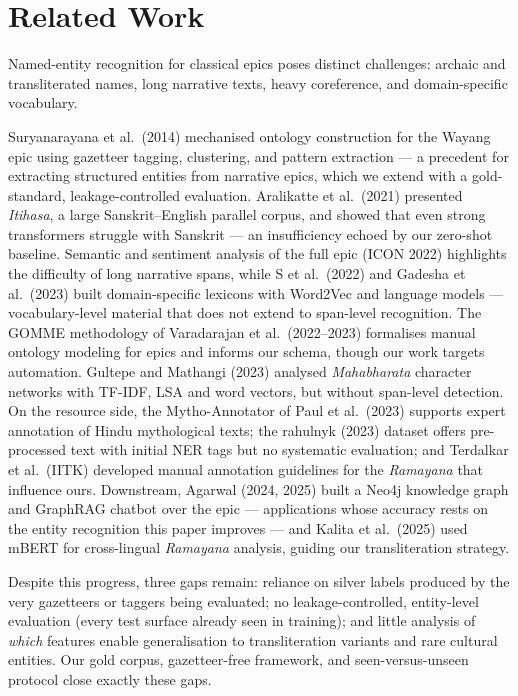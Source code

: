 \documentclass[conference]{IEEEtran}
\begin{document}
\section{Related Work}
\label{sec:related}

Named-entity recognition for classical epics poses distinct challenges: archaic and transliterated names, long narrative texts, heavy coreference, and domain-specific vocabulary.

Suryanarayana et al.\ (2014) mechanised ontology construction for the Wayang epic using gazetteer tagging, clustering, and pattern extraction --- a precedent for extracting structured entities from narrative epics, which we extend with a gold-standard, leakage-controlled evaluation. Aralikatte et al.\ (2021) presented \emph{Itihasa}, a large Sanskrit--English parallel corpus, and showed that even strong transformers struggle with Sanskrit --- an insufficiency echoed by our zero-shot baseline. Semantic and sentiment analysis of the full epic (ICON 2022) highlights the difficulty of long narrative spans, while S et al.\ (2022) and Gadesha et al.\ (2023) built domain-specific lexicons with Word2Vec and language models --- vocabulary-level material that does not extend to span-level recognition. The GOMME methodology of Varadarajan et al.\ (2022--2023) formalises manual ontology modeling for epics and informs our schema, though our work targets automation. Gultepe and Mathangi (2023) analysed \emph{Mahabharata} character networks with TF-IDF, LSA and word vectors, but without span-level detection. On the resource side, the Mytho-Annotator of Paul et al.\ (2023) supports expert annotation of Hindu mythological texts; the rahulnyk (2023) dataset offers pre-processed text with initial NER tags but no systematic evaluation; and Terdalkar et al.\ (IITK) developed manual annotation guidelines for the \emph{Ramayana} that influence ours. Downstream, Agarwal (2024, 2025) built a Neo4j knowledge graph and GraphRAG chatbot over the epic --- applications whose accuracy rests on the entity recognition this paper improves --- and Kalita et al.\ (2025) used mBERT for cross-lingual \emph{Ramayana} analysis, guiding our transliteration strategy.

Despite this progress, three gaps remain: reliance on silver labels produced by the very gazetteers or taggers being evaluated; no leakage-controlled, entity-level evaluation (every test surface already seen in training); and little analysis of \emph{which} features enable generalisation to transliteration variants and rare cultural entities. Our gold corpus, gazetteer-free framework, and seen-versus-unseen protocol close exactly these gaps.
\end{document}
